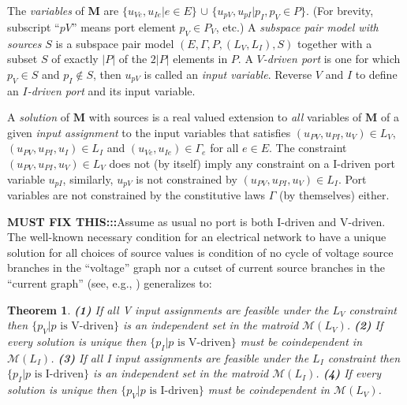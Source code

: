 \documentclass{amsproc-sunycstr}
\theoremstyle{plain}
\newtheorem{theorem}{Theorem}
\theoremstyle{definition}
\theoremstyle{remark}
\newcommand{\extra}[1]{{{#1}}}
\begin{document}
The \textit{variables} of $\mathbf{M}$ are 
$\{u_{\mathit{Ve}}, u_{\mathit{Ie}} | e \in E\}$  $\cup$ %
$\{ u_{\mathit{pV}}, u_{\mathit{pI}} | p_I, p_V \in P \}$.  
(For brevity, subscript ``$\mathit{pV}$'' means port element
$p_V\in P_V$, etc.)
A \textit{subspace pair model with sources} $S$ 
is a subspace pair model $(E, \Gamma, P, (L_V, L_I), S)$
together with a subset $S$ of exactly $|P|$ of the $2|P|$ elements
in $P$.  A \textit{$V$-driven port} is 
one for which 
$p_V\in S$ and $p_I\not\in S$, then $u_{\mathit{pV}}$ is called 
an \textit{input variable}.   Reverse $V$ and $I$ to define an 
\textit{$I$-driven port} and its input variable.

A \textit{solution} of $\mathbf{M}$ with sources
is a real valued extension to \textit{all} variables of $\mathbf{M}$ 
of a given \textit{input assignment} to the input variables
that satisfies
$(u_{\mathit{PV}}, u_{\mathit{PI}}, u_V) \in L_V$,
$(u_{\mathit{PV}}, u_{\mathit{PI}}, u_I) \in L_I$
and
$(u_{\mathit{Ve}}, u_{\mathit{Ie}}) \in \Gamma_e$ for all
$e\in E$.
The constraint 
$(u_{\mathit{PV}}, u_{\mathit{PI}}, u_V) \in L_V$ 
does not (by itself) imply any constraint
on a I-driven port variable $u_{\mathit{pI}}$, similarly, 
$u_{\mathit{pV}}$ is not constrained
by 
$(u_{\mathit{PV}}, u_{\mathit{PI}}, u_V) \in L_I$.
\extra{Port variables are not constrained
by the constitutive laws $\Gamma$ (by themselves) either.}

\textbf{MUST FIX THIS:::}Assume as usual 
no port is both I-driven and V-driven.
The 
\extra{well-known necessary condition
for an electrical network to have a unique 
solution for all choices of source values is}
condition of no cycle of voltage source branches
in the ``voltage'' graph nor a
cutset of current source branches in the ``current graph'' (see, e.g.,
\cite{ChensBook})
generalizes to:


\begin{theorem}
\label{Feasiblity1}
\textbf{(1)} If all V input assignments are feasible under
the $L_V$ constraint then 
$\{p_V|p \mbox{\ is V-driven}\}$
is an independent set in the matroid $\mathcal{M}(L_V)$.
\textbf{(2)} If every solution is unique then %
$\{p_I|p \mbox{\ is V-driven}\}$
must be coindependent in $\mathcal{M}(L_I)$.
\textbf{(3)} 
If all I input assignments are feasible under
the $L_I$ constraint then 
$\{p_I|p \mbox{\ is I-driven}\}$
is an independent set in the matroid $\mathcal{M}(L_I)$.
\textbf{(4)} If every solution is unique 
then
$\{p_V|p \mbox{\ is I-driven}\}$
must be coindependent in $\mathcal{M}(L_V)$.
\end{theorem}
\end{document}
